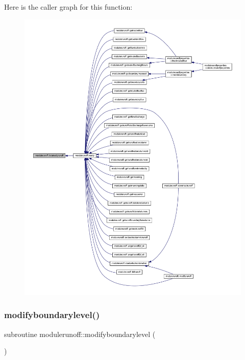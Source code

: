 Here is the caller graph for this function\+:
\nopagebreak
\begin{figure}[H]
\begin{center}
\leavevmode
\includegraphics[width=350pt]{namespacemodulerunoff_a573ec5acc76c43856a82166862259a60_icgraph}
\end{center}
\end{figure}
\mbox{\label{namespacemodulerunoff_aac03c1526e1f45dcfe31d200ac141d7e}} 
\subsubsection{\texorpdfstring{modifyboundarylevel()}{modifyboundarylevel()}}
{\footnotesize\ttfamily subroutine modulerunoff\+::modifyboundarylevel (\begin{DoxyParamCaption}{ }\end{DoxyParamCaption})\hspace{0.3cm}{\ttfamily [private]}}

